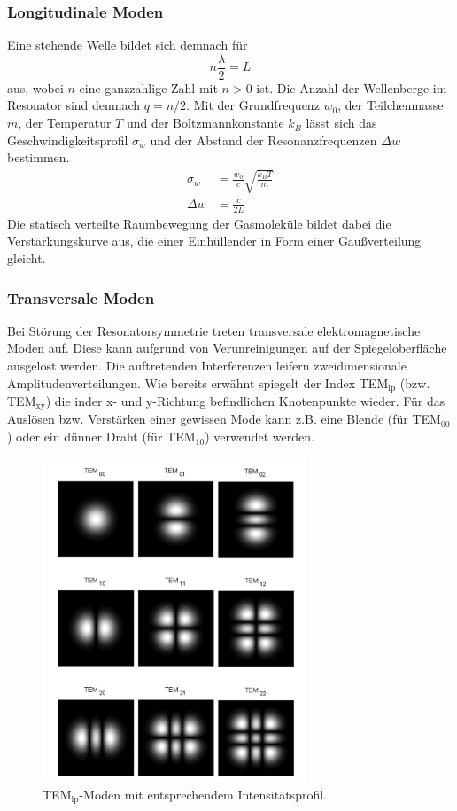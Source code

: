 \subsubsection{Longitudinale Moden}
Eine stehende Welle bildet sich demnach für
\begin{equation}
    n\frac{\lambda}{2}=L
\end{equation}
aus, wobei $n$ eine ganzzahlige Zahl mit $n>0$ ist. Die Anzahl der Wellenberge im Resonator sind demnach $q=n/2$.
Mit der Grundfrequenz $w_0$, der Teilchenmasse $m$, der Temperatur $T$ und der Boltzmannkonstante $k_B$ lässt sich das Geschwindigkeitsprofil $\sigma_w$
und der Abstand der Resonanzfrequenzen $\Delta w$ bestimmen.
\begin{align}
    \sigma_w&=\frac{w_0}{c}\sqrt{\frac{k_B T}{m}}\\
    \Delta w &=\frac{c}{2L}
\end{align}
Die statisch verteilte Raumbewegung der Gasmoleküle bildet dabei die Verstärkungskurve aus, die einer Einhüllender in Form einer Gaußverteilung gleicht.
\subsubsection{Transversale Moden}
Bei Störung der Resonatorsymmetrie treten transversale elektromagnetische Moden auf. Diese kann aufgrund von Verunreinigungen auf
der Spiegeloberfläche ausgelost werden. Die auftretenden Interferenzen leifern zweidimensionale Amplitudenverteilungen.
Wie bereits erwähnt spiegelt der Index TEM$_{\text{lp}}$ (bzw. TEM$_{\text{xy}}$) die inder x- und y-Richtung befindlichen Knotenpunkte wieder.
Für das Auslösen bzw. Verstärken einer gewissen Mode kann z.B. eine Blende (für TEM$_{00}$) oder ein dünner Draht (für TEM$_{10}$) verwendet werden.
\begin{figure}
    \center
    \includegraphics[width=0.7\textwidth]{bilder/moden.jpg}
    \caption{TEM$_{\text{lp}}$-Moden mit entsprechendem Intensitätsprofil.}
\end{figure}